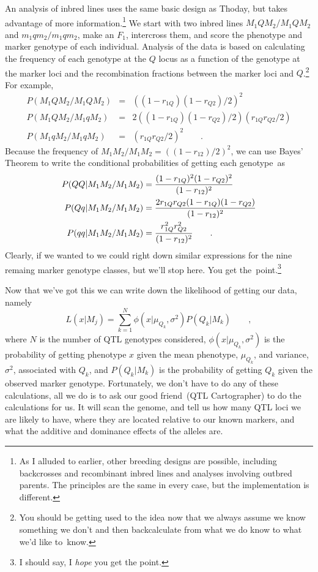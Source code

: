 \documentclass[12pt]{article}
\begin{document}
An analysis of inbred lines uses the same basic design as Thoday, but
takes advantage of more information.\footnote{As I alluded to earlier,
  other breeding designs are possible, including backcrosses and
  recombinant inbred lines and analyses involving outbred parents. The
  principles are the same in every case, but the implementation is
  different.} We start with two inbred lines $M_1QM_2/M_1QM_2$ and
$m_1qm_2/m_1qm_2$, make an $F_1$, intercross them, and score the
phenotype and marker genotype of each individual. Analysis of the data
is based on calculating the frequency of each genotype at the $Q$
locus as a function of the genotype at the marker loci and the
recombination fractions between the marker loci and $Q$.\footnote{You
  should be getting used to the idea now that we always assume we know
  something we don't and then backcalculate from what we do know to
  what we'd like to~know.} For example,
\begin{eqnarray*}
P(M_1QM_2/M_1QM_2) &=& \left((1-r_{1Q})(1-r_{Q2})/2\right)^2 \\
P(M_1QM_2/M_1qM_2) &=& 2\left((1-r_{1Q})(1-r_{Q2})/2\right)
                       \left(r_{1Q}r_{Q2}/2\right) \\
P(M_1qM_2/M_1qM_2) &=& \left(r_{1Q}r_{Q2}/2\right)^2 \qquad .
\end{eqnarray*}
Because the frequency of $M_1M_2/M_1M_2 = \left((1-r_{12})/2\right)^2$,
we can use Bayes' Theorem to write the conditional probabilities of
getting each genotype~as
\begin{eqnarray*}
P(QQ|M_1M_2/M_1M_2) &= {(1-r_{1Q})^2(1-r_{Q2})^2 \over (1-r_{12})^2} \\
P(Qq|M_1M_2/M_1M_2) &= {2r_{1Q}r_{Q2}(1-r_{1Q})(1-r_{Q2})
                       \over (1-r_{12})^2} \\
P(qq|M_1M_2/M_1M_2) &= {r_{1Q}^2 r_{Q2}^2 \over (1-r_{12})^2} 
                       \qquad .
\end{eqnarray*}
Clearly, if we wanted to we could right down similar expressions for
the nine remaing marker genotype classes, but we'll stop here. You get
the~point.\footnote{I should say, I {\it hope\/} you get the point.}

Now that we've got this we can write down the likelihood of getting
our data, namely
\[
L(x|M_j) = \sum_{k=1}^N \phi (x|\mu_{Q_k}, \sigma^2) P(Q_k|M_k) \qquad ,
\]
where $N$ is the number of QTL genotypes considered, $\phi
(x|\mu_{Q_k}, \sigma^2)$ is the probability of getting phenotype $x$
given the mean phenotype, $\mu_{Q_k}$, and variance, $\sigma^2$,
associated with $Q_k$, and $P(Q_k|M_k)$ is the probability of getting
$Q_k$ given the observed marker genotype. Fortunately, we don't have
to do any of these calculations, all we do is to ask our good
friend~(QTL Cartographer) to do the calculations for us. It will scan
the genome, and tell us how many QTL loci we are likely to have, where
they are located relative to our known markers, and what the additive
and dominance effects of the alleles are. 
\end{document}
